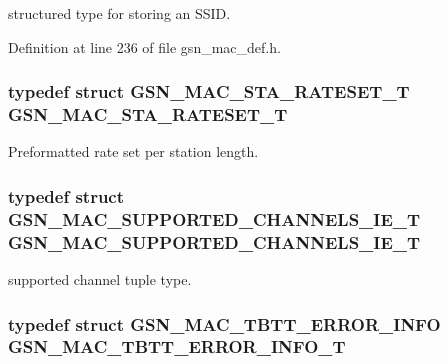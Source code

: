 structured type for storing an SSID. 



Definition at line 236 of file gsn\_\-mac\_\-def.h.

\hypertarget{a00642_gaaffd1c48ebeedf03ed41954311a17ec0}{
\subsubsection[{GSN\_\-MAC\_\-STA\_\-RATESET\_\-T}]{\setlength{\rightskip}{0pt plus 5cm}typedef struct {\bf GSN\_\-MAC\_\-STA\_\-RATESET\_\-T}  {\bf GSN\_\-MAC\_\-STA\_\-RATESET\_\-T}}}
\label{a00642_gaaffd1c48ebeedf03ed41954311a17ec0}


Preformatted rate set per station length. 

\hypertarget{a00642_ga0e3372dcd5ddb7b5c77b4d1d132cd8c4}{
\subsubsection[{GSN\_\-MAC\_\-SUPPORTED\_\-CHANNELS\_\-IE\_\-T}]{\setlength{\rightskip}{0pt plus 5cm}typedef struct {\bf GSN\_\-MAC\_\-SUPPORTED\_\-CHANNELS\_\-IE\_\-T}  {\bf GSN\_\-MAC\_\-SUPPORTED\_\-CHANNELS\_\-IE\_\-T}}}
\label{a00642_ga0e3372dcd5ddb7b5c77b4d1d132cd8c4}


supported channel tuple type. 

\hypertarget{a00642_ga172482aaa298a33c998f4206dd7e558a}{
\subsubsection[{GSN\_\-MAC\_\-TBTT\_\-ERROR\_\-INFO\_\-T}]{\setlength{\rightskip}{0pt plus 5cm}typedef struct {\bf GSN\_\-MAC\_\-TBTT\_\-ERROR\_\-INFO}  {\bf GSN\_\-MAC\_\-TBTT\_\-ERROR\_\-INFO\_\-T}}}
\label{a00642_ga172482aaa298a33c998f4206dd7e558a}


